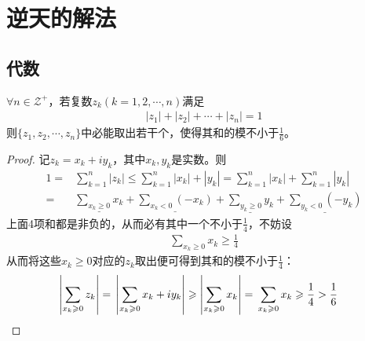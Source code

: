 
\chapter{逆天的解法}
\label{chap:genius-solution}

\section{代数}
\label{sec:genius-solution-algebra}

\begin{example}
  $\forall n\in\mathcal{Z}^+$，若复数$z_k(k=1,2,\cdots,n)$满足
  \begin{align*}
    |z_1| + |z_2| + \cdots + |z_n| = 1
  \end{align*}
  则$\{z_1,z_2,\cdots,z_n\}$中必能取出若干个，使得其和的模不小于$\frac16$。
\end{example}
\begin{proof}
  记$z_k=x_k + i y_k$，其中$x_k,y_k$是实数。则
  \begin{align*}
    1 ={}& \sum_{k=1}^n |z_k| \le \sum_{k=1}^n |x_k| + |y_k|
    = \sum_{k=1}^n |x_k| + \sum_{k=1}^n |y_k|\\
    ={}& \underline{\sum_{x_k\ge 0}x_k} + \underline{\sum_{x_k<0}(-x_k)} +
         \underline{\sum_{y_k\ge 0}y_k} + \underline{\sum_{y_k<0}(-y_k)}
  \end{align*}
  上面4项和都是非负的，从而必有其中一个不小于$\frac14$，不妨设
  \begin{align*}
    \sum_{x_k\ge 0}x_k\ge\frac14
  \end{align*}
  从而将这些$x_k\ge 0$对应的$z_k$取出便可得到其和的模不小于$\frac14$：
  \begin{align*}
    \left|\sum_{x_k\ge0}z_k \right|={}&\left| \sum_{x_k\ge0} x_k+iy_k \right|\ge \left| \sum_{x_k\ge0}x_k \right|
    ={}\sum_{x_k\ge0}x_k\ge\frac14>\frac16&\qedhere
  \end{align*}
\end{proof}

